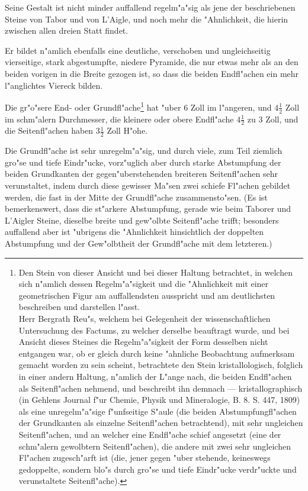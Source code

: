 \documentclass[a4paper, 11pt, oneside, german]{article}
\begin{document}
Seine Gestalt ist nicht minder auffallend regelm"a"sig als jene der beschriebenen Steine von Tabor und von L'Aigle, und noch mehr die "Ahnlichkeit, die hierin zwischen allen dreien Statt findet.

Er bildet n"amlich ebenfalls eine deutliche, verschoben und ungleichseitig vierseitige, stark abgestumpfte, niedere Pyramide, die nur etwas mehr als an den beiden vorigen in die Breite gezogen ist, so dass die beiden Endfl"achen ein mehr l"anglichtes Viereck bilden.

Die gr"o"sere End- oder Grundfl"ache\footnote{Den Stein von dieser Ansicht und bei dieser Haltung betrachtet, in welchen sich n"amlich dessen Regelm"a"sigkeit und die "Ahnlichkeit mit einer geometrischen Figur am auffallendsten ausspricht und am deutlichsten beschreiben und darstellen l"asst.\\
\hspace*{6mm}Herr Bergrath Reu"s, welchem bei Gelegenheit der wissenschaftlichen Untersuchung des Factums, zu welcher derselbe beauftragt wurde, und bei Ansicht dieses Steines die Regelm"a"sigkeit der Form desselben nicht entgangen war, ob er gleich durch keine "ahnliche Beobachtung aufmerksam gemacht worden zu sein scheint, betrachtete den Stein kristallologisch, folglich in einer andern Haltung, n"amlich der L"ange nach, die beiden Endfl"achen als Seitenfl"achen nehmend, und beschreibt ihn demnach --- kristallographisch (in Gehlens Journal f"ur Chemie, Physik und Mineralogie, B. 8. S. 447, 1809) als eine unregelm"a"sige f"unfseitige S"aule (die beiden Abstumpfungfl"achen der Grundkanten als einzelne Seitenfl"achen betrachtend), mit sehr ungleichen Seitenfl"achen, und an welcher eine Endfl"ache schief angesetzt (eine der schm"alern gewolbtern Seitenfl"achen), die andere mit zwei sehr ungleichen Fl"achen zugesch"arft ist (die, jener gegen "uber stehende, keineswegs gedoppelte, sondern blo"s durch gro"se und tiefe Eindr"ucke verdr"uckte und verunstaltete Seitenfl"ache).} hat "uber 6 Zoll im l"angeren, und $4\frac{1}{2}$ Zoll im schm"alern Durchmesser, die kleinere oder obere Endfl"ache $4\frac{1}{2}$ zu 3 Zoll, und die Seitenfl"achen haben $3\frac{1}{2}$ Zoll H"ohe.

Die Grundfl"ache ist sehr unregelm"a"sig, und durch viele, zum Teil ziemlich gro"se und tiefe Eindr"ucke, vorz"uglich aber durch starke Abstumpfung der beiden Grundkanten der gegen"uberstehenden breiteren Seitenfl"achen sehr verunstaltet, indem durch diese gewisser Ma"sen zwei schiefe Fl"achen gebildet werden, die fast in der Mitte der Grundfl"ache zusammensto"sen. (Es ist bemerkenswert, dass die st"arkere Abstumpfung, gerade wie beim Taborer und L'Aigler Steine, dieselbe breite und gew"olbte Seitenfl"ache trifft; besonders auffallend aber ist "ubrigens die "Ahnlichkeit hinsichtlich der doppelten Abstumpfung und der Gew"olbtheit der Grundfl"ache mit dem letzteren.)
\end{document}
